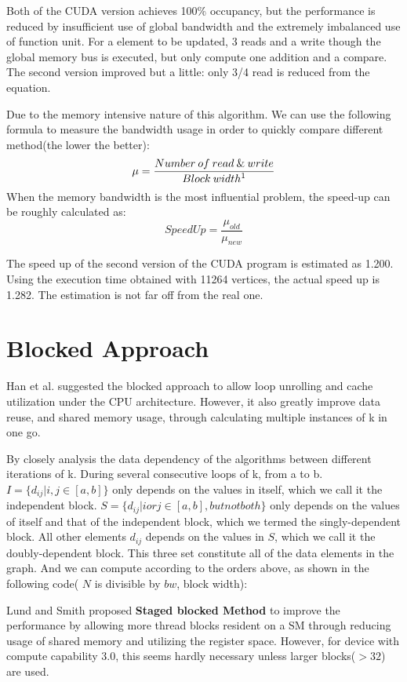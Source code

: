 \documentclass[12pt,a4paper]{article}
\newcommand{\keyword}[1]{{\bfseries \nobreakdash #1}}
\begin{document}
Both of the CUDA version achieves 100\% occupancy, but the performance is reduced by insufficient use of global bandwidth and the extremely imbalanced use of function unit. For a element to be updated, 3 reads and a write though the global memory bus is executed, but only compute one addition and a compare. The second version improved but a little: only 3/4 read is reduced from the equation. 

Due to the memory intensive nature of this algorithm. We can use the following formula to measure the bandwidth usage in order to quickly compare different method(the lower the better):
\[ \mu = \frac{Number\:of\:read\:\&\:write}{Block\:width \footnotemark[1] } \]
When the memory bandwidth is the most influential problem, the speed-up can be roughly calculated as:
\[ Speed Up = \frac{\mu_{old}}{\mu_{new}} \]

The speed up of the second version of the CUDA program is estimated as 1.200. Using the execution time obtained with 11264 vertices, the actual speed up is 1.282. The estimation is not far off from the real one.

\section{Blocked Approach}

Han et al.\cite{Han06} suggested the blocked approach to allow loop unrolling and cache utilization under the CPU architecture. However, it also greatly improve data reuse, and shared memory usage, through calculating multiple instances of k in one go.

By closely analysis the data dependency of the algorithms between different iterations of k. During several consecutive loops of k, from a to b. $I=\{ d_{ij}| i,j \in [a,b]\}$ only depends on the values in itself, which we call it the independent block. $S=\{ d_{ij}| i or j \in [a,b], but not both \}$ only depends on the values of itself and that of the independent block, which we termed the singly-dependent block. All other elements $d_{ij}$ depends on the values in $S$, which we call it the doubly-dependent block. This three set constitute all of the data elements in the graph. And we can compute according to the orders above, as shown in the following code( $N$ is divisible by $bw$, block width):



Lund and Smith\cite{Lun10} proposed \keyword{Staged blocked Method} to improve the performance by allowing more thread blocks resident on a SM through reducing usage of shared memory and utilizing the register space. However, for device with compute capability 3.0, this seems hardly necessary unless larger blocks($ >32 $) are used.
\end{document}
